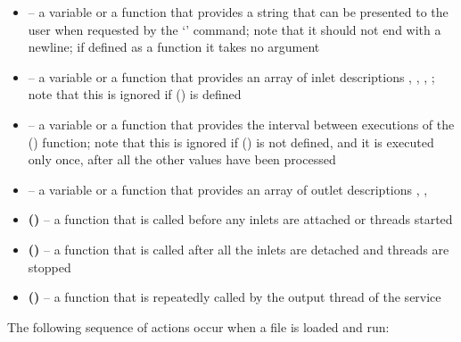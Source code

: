 \begin{itemize}
\item \textbf{} -- a variable or a function that provides a
string that can be presented to the user when requested by the `' command; note
that it should not end with a newline; if defined as a function it takes no argument
\item \textbf{} -- a variable or a function that provides an array of
inlet descriptions \openSq{}, ,
, \closeSq; note that this is ignored if
() is defined
\item \textbf{} -- a variable or a function that provides the
interval between executions of the () function; note that this is
ignored if () is not defined, and it is executed only once, after all
the other values have been processed
\item \textbf{} -- a variable or a function that provides an array
of outlet descriptions \openSq{}, ,
\closeSq
\item \textbf{()} -- a function that is called before any inlets
are attached or threads started
\item \textbf{()} -- a function that is called after all the inlets
are detached and threads are stopped
\item \textbf{()} -- a function that is repeatedly called by the
output thread of the service
\end{itemize}
\secondaryEnd{}
\newpage
{}
The following sequence of actions occur when a \JS{} file is loaded and run:

